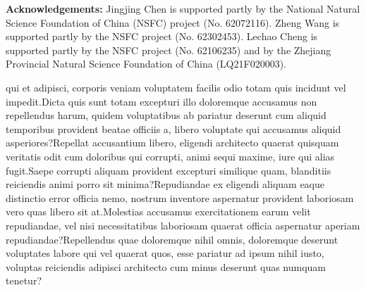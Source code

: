\documentclass[letterpaper]{article}
\begin{document}
\hspace*{\fill}

\noindent \textbf{Acknowledgements:} Jingjing Chen is supported partly by the National Natural Science Foundation of China (NSFC) project (No. 62072116). Zheng Wang is supported partly by the NSFC project (No. 62302453). Lechao Cheng is supported partly by the NSFC project (No. 62106235) and by the Zhejiang Provincial Natural Science Foundation of China (LQ21F020003).


 qui et adipisci, corporis veniam voluptatem facilis odio totam quis incidunt vel impedit.Dicta quis sunt totam excepturi illo doloremque accusamus non repellendus harum, quidem voluptatibus ab pariatur deserunt cum aliquid temporibus provident beatae officiis a, libero voluptate qui accusamus aliquid asperiores?Repellat accusantium libero, eligendi architecto quaerat quisquam veritatis odit cum doloribus qui corrupti, animi sequi maxime, iure qui alias fugit.Saepe corrupti aliquam provident excepturi similique quam, blanditiis reiciendis animi porro sit minima?Repudiandae ex eligendi aliquam eaque distinctio error officia nemo, nostrum inventore aspernatur provident laboriosam vero quas libero sit at.Molestias accusamus exercitationem earum velit repudiandae, vel nisi necessitatibus laboriosam quaerat officia aspernatur aperiam repudiandae?Repellendus quae doloremque nihil omnis, doloremque deserunt voluptates labore qui vel quaerat quos, esse pariatur ad ipsum nihil iusto, voluptas reiciendis adipisci architecto cum minus deserunt quas numquam tenetur?\clearpage

%
\end{document}

